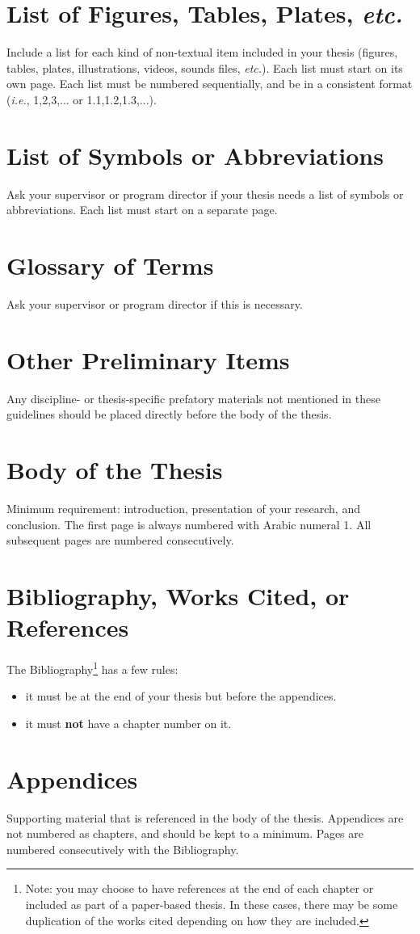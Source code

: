 	\section{List of Figures, Tables, Plates, \textit{etc.}}
		Include a list for each kind of non-textual item included in your thesis (figures, tables, plates, illustrations, videos, sounds files, \textit{etc.}).
		Each list must start on its own page.
		Each list must be numbered sequentially, and be in a consistent format (\textit{i.e.}, 1,2,3,... or 1.1,1.2,1.3,...).

	\section{List of Symbols or Abbreviations}
		Ask your supervisor or program director if your thesis needs a list of symbols or abbreviations. 
		Each list must start on a separate page.

	\section{Glossary of Terms}
		Ask your supervisor or program director if this is necessary.

	\section{Other Preliminary Items}
		Any discipline- or thesis-specific prefatory materials not mentioned in these guidelines should be placed directly before the body of the thesis.

	\section{Body of the Thesis}
		Minimum requirement: introduction, presentation of your research, and conclusion. The first page is always numbered with Arabic numeral 1. All subsequent pages are numbered consecutively.

	\section{Bibliography, Works Cited, or References}
		The Bibliography\footnote{Note: you may choose to have references at the end of each chapter or included as part of a paper-based thesis. In these cases, there may be some duplication of the works cited depending on how they are included.} has a few rules:
		\begin{itemize}
			\item it must be at the end of your thesis but before the appendices.
			\item it must \textbf{not} have a chapter number on it.
		\end{itemize}

	\section{Appendices}
		Supporting material that is referenced in the body of the thesis. 
		Appendices are not numbered as chapters, and should be kept to a minimum. 
		Pages are numbered consecutively with the Bibliography.